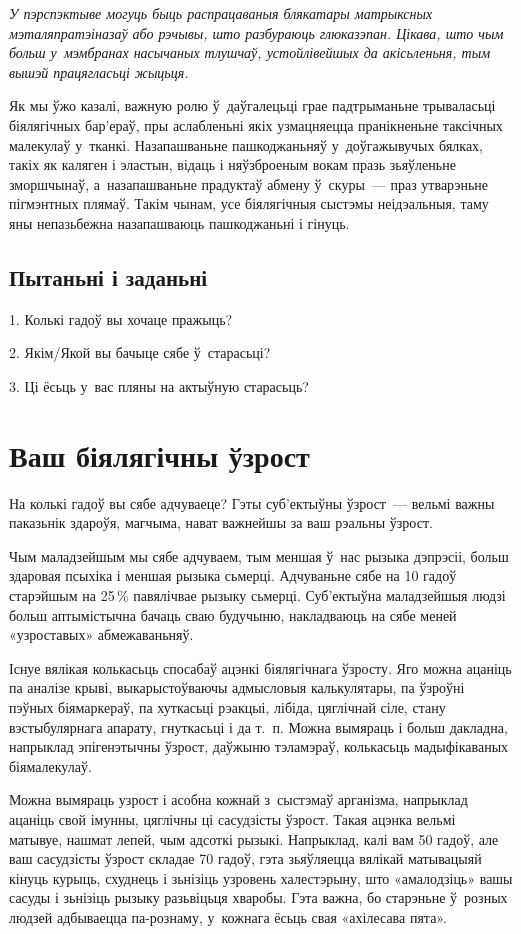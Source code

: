 \emph{У пэрспэктыве могуць быць распрацаваныя блякатары матрыксных мэталяпратэіназаў або рэчывы, што разбураюць глюказэпан. Цікава, што чым больш у~мэмбранах насычаных тлушчаў, устойлівейшых да акісьленьня, тым вышэй працягласьці жыцьця.}

Як мы ўжо казалі, важную ролю ў~даўгалецьці грае падтрыманьне трываласьці біялягічных бар'ераў, пры аслабленьні якіх узмацняецца пранікненьне таксічных малекулаў у~тканкі. Назапашваньне пашкоджаньняў у~доўгажывучых бялках, такіх як каляген і эластын, відаць і няўзброеным вокам празь зьяўленьне зморшчынаў, а~назапашваньне прадуктаў абмену ў~скуры~--- праз утварэньне пігмэнтных плямаў. Такім чынам, усе біялягічныя сыстэмы неідэальныя, таму яны непазьбежна назапашваюць пашкоджаньні і гінуць.

\subsection*{Пытаньні і заданьні}

1. Колькі гадоў вы хочаце пражыць?

2. Якім/Якой вы бачыце сябе ў~старасьці?

3. Ці ёсьць у~вас пляны на актыўную старасьць?


\section{Ваш біялягічны ўзрост}

На колькі гадоў вы сябе адчуваеце? Гэты суб'ектыўны ўзрост~--- вельмі важны паказьнік здароўя, магчыма, нават важнейшы за ваш рэальны ўзрост.

Чым маладзейшым мы сябе адчуваем, тым меншая ў~нас рызыка дэпрэсіі, больш здаровая псыхіка і меншая рызыка сьмерці. Адчуваньне сябе на 10 гадоў старэйшым на 25\,\% павялічвае рызыку сьмерці. Суб'ектыўна маладзейшыя людзі больш аптымістычна бачаць сваю будучыню, накладваюць на сябе меней «узроставых» абмежаваньняў.

Існуе вялікая колькасьць спосабаў ацэнкі біялягічнага ўзросту. Яго можна ацаніць па аналізе крыві, выкарыстоўваючы адмысловыя калькулятары, па ўзроўні пэўных біямаркераў, па хуткасьці рэакцыі, лібіда, цяглічнай сіле, стану вэстыбулярнага апарату, гнуткасьці і да т.~п. Можна вымяраць і больш дакладна, напрыклад эпігенэтычны ўзрост, даўжыню тэламэраў, колькасьць мадыфікаваных біямалекулаў.

Можна вымяраць узрост і асобна кожнай з~сыстэмаў арганізма, напрыклад ацаніць свой імунны, цяглічны ці сасудзісты ўзрост. Такая ацэнка вельмі матывуе, нашмат лепей, чым адсоткі рызыкі. Напрыклад, калі вам 50 гадоў, але ваш сасудзісты ўзрост складае 70 гадоў, гэта зьяўляецца вялікай матывацыяй кінуць курыць, схуднець і зьнізіць узровень халестэрыну, што «амалодзіць» вашы сасуды і зьнізіць рызыку разьвіцьця хваробы. Гэта важна, бо старэньне ў~розных людзей адбываецца па-рознаму, у~кожнага ёсьць свая «ахілесава пята».

